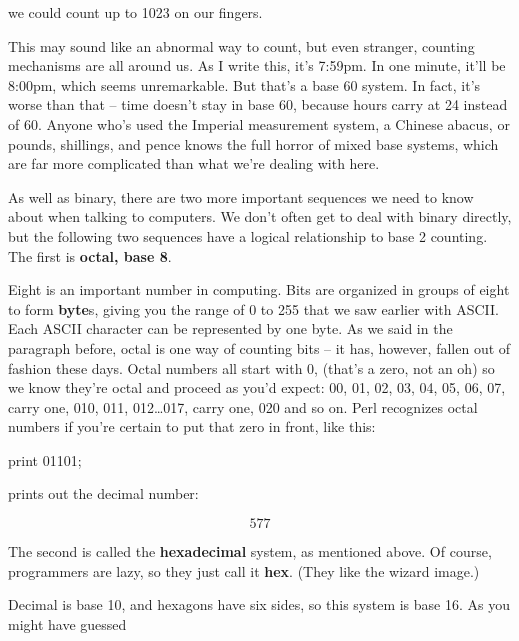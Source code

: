 \documentclass[a4paper,11pt]{book}
\begin{document}
\noindent we could count up to 1023 on our fingers.

\noindent 

\noindent This may sound like an abnormal way to count, but even stranger, counting mechanisms are all around us. As I write this, it's 7:59pm. In one minute, it'll be 8:00pm, which seems unremarkable. But that's a base 60 system. In fact, it's worse than that -- time doesn't stay in base 60, because hours carry at 24 instead of 60. Anyone who's used the Imperial measurement system, a Chinese abacus, or pounds, shillings, and pence knows the full horror of mixed base systems, which are far more complicated than what we're dealing with here.

\noindent 

\noindent As well as binary, there are two more important sequences we need to know about when talking to computers. We don't often get to deal with binary directly, but the following two sequences have a logical relationship to base 2 counting. The first is \textbf{octal, base 8}.

\noindent 

\noindent Eight is an important number in computing. Bits are organized in groups of eight to form \textbf{byte}s, giving you the range of 0 to 255 that we saw earlier with ASCII. Each ASCII character can be represented by one byte. As we said in the paragraph before, octal is one way of counting bits -- it has, however, fallen out of fashion these days. Octal numbers all start with 0, (that's a zero, not an oh) so we know they're octal and proceed as you'd expect: 00, 01, 02, 03, 04, 05, 06, 07, carry one, 010, 011, 012\dots 017, carry one, 020 and so on. Perl recognizes octal numbers if you're certain to put that zero in front, like this:

\noindent 

\noindent print 01101;

\noindent 

\noindent prints out the decimal number:

\noindent 

\[577\] 


\noindent The second is called the \textbf{hexadecimal }system, as mentioned above. Of course, programmers are lazy, so they just call it \textbf{hex}. (They like the wizard image.)

\noindent 

\noindent 

\noindent Decimal is base 10, and hexagons have six sides, so this system is base 16. As you might have guessed
\end{document}
